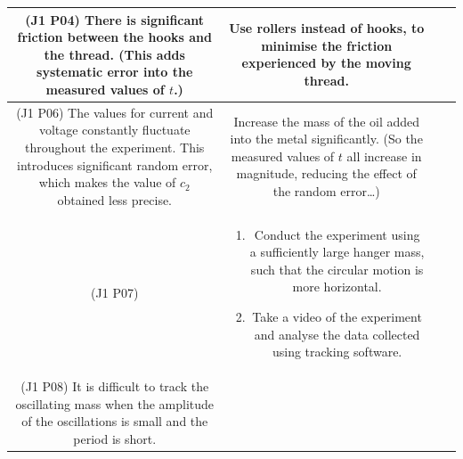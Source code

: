 \documentclass[oneside]{book}
\begin{document}
\begin{itemize}
\begin{longtable}{|Sc|Sc|}
        \hline
        \begin{minipage}{0.5\textwidth-25.2pt}
            (J1 P04) There is significant friction between the hooks and the thread. (This adds systematic error into the measured values of \(t\).)
        \end{minipage}&
        \begin{minipage}{0.5\textwidth-25.2pt}
            Use rollers instead of hooks, to minimise the friction experienced by the moving thread.
        \end{minipage}\\
        \hline 
        \begin{minipage}{0.5\textwidth-25.2pt}
            (J1 P06) The values for current and voltage constantly fluctuate throughout the experiment. This introduces significant random error, which makes the value of \(c_2\) obtained less precise.
        \end{minipage}&
        \begin{minipage}{0.5\textwidth-25.2pt}
            Increase the mass of the oil added into the metal significantly. (So the measured values of \(t\) all increase in magnitude, reducing the effect of the random error\dots)
        \end{minipage}\\
        \hline
        \begin{minipage}{0.5\textwidth-25.2pt}
            (J1 P07)
        \end{minipage}&
        \begin{minipage}{0.5\textwidth-25.2pt}
            \begin{enumerate}[label=\arabic*.]
                \item Conduct the experiment using a sufficiently large hanger mass, such that the circular motion is more horizontal.
                \item Take a video of the experiment and analyse the data collected using tracking software.  
            \end{enumerate}
        \end{minipage}\\
        \hline
        \begin{minipage}{0.5\textwidth-25.2pt}
            (J1 P08) It is difficult to track the oscillating mass when the amplitude of the oscillations is small and the period is short.
        \end{minipage}&
        \begin{minipage}{0.5\textwidth-25.2pt}

\end{minipage}
\end{longtable}
\end{itemize}
\end{document}
